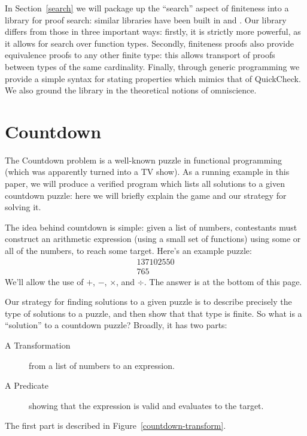 In Section~\ref{search} we will package up the ``search'' aspect of finiteness
into a library for proof search: similar libraries have been built in
\cite{fruminFiniteSetsHomotopy2018} and
\cite{firsovDependentlyTypedProgramming2015}.
Our library differs from those in three important ways: firstly, it is strictly
more powerful, as it allows for search over function types.
Secondly, finiteness proofs also provide equivalence proofs to any other finite
type: this allows transport of proofs between types of the same cardinality.
Finally, through generic programming we provide a simple syntax for stating
properties which mimics that of QuickCheck.
We also ground the library in the theoretical notions of omniscience.
\section{Countdown}
The Countdown problem \cite{huttonCountdownProblem2002} is a well-known puzzle
in functional programming (which was apparently turned into a TV show).
As a running example in this paper, we will produce a verified program which
lists all solutions to a given countdown puzzle: here we will briefly explain
the game and our strategy for solving it.

The idea behind countdown is simple: given a list of numbers, contestants must
construct an arithmetic expression (using a small set of functions) using some
or all of the numbers, to reach some target.
Here's an example puzzle:
\begin{gather*}
  \boxed{1} \boxed{3} \boxed{7} \boxed{10} \boxed{25} \boxed{50} \\
  \boxed{765} \tag{Target}
\end{gather*}
We'll allow the use of \(+\), \(-\), \(\times\), and \(\div\).
The answer is at the bottom of this page\footnotemark.


Our strategy for finding solutions to a given puzzle is to describe precisely
the type of solutions to a puzzle, and then show that that type is finite.
So what is a ``solution'' to a countdown puzzle?
Broadly, it has two parts:
\begin{description}
  \item[A Transformation] from a list of numbers to an expression.
  \item[A Predicate] showing that the expression is valid and evaluates to the
    target.
\end{description}
The first part is described in Figure~\ref{countdown-transform}.

